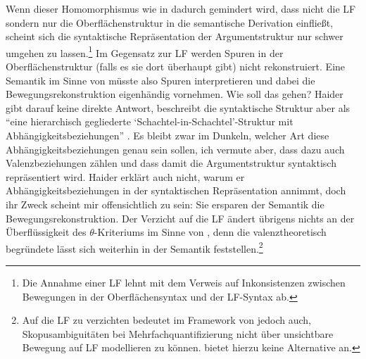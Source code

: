 {Wenn dieser Homomorphismus wie in \cite{Haider:04} dadurch gemindert wird, dass nicht die LF sondern nur die Oberflächenstruktur in die semantische Derivation einflie\ss t, scheint sich die syntaktische Repräsentation der Argumentstruktur nur schwer umgehen zu lassen.\footnote{Die Annahme einer LF lehnt \cite{Haider:04} mit dem Verweis auf Inkonsistenzen zwischen Bewegungen in der Oberflächensyntax und der LF-Syntax ab.} Im Gegensatz zur LF werden Spuren in der Oberflächenstruktur (falls es sie dort überhaupt gibt) nicht rekonstruiert. Eine Semantik im Sinne von \cite{Heim:Kratzer:98} müsste also Spuren interpretieren und dabei die Bewegungsrekonstruktion eigenhändig vornehmen. Wie soll das gehen? Haider gibt darauf keine direkte Antwort, beschreibt die syntaktische Struktur aber als "`eine hierarchisch gegliederte `Schachtel-in-Schachtel'-Struktur mit Abhängigkeitsbeziehungen"' \citep[73]{Haider:04}. Es bleibt zwar im Dunkeln, welcher Art diese Abhängigkeitsbeziehungen genau sein sollen, ich vermute aber, dass dazu auch Valenzbeziehungen zählen und dass damit die Argumentstruktur syntaktisch repräsentiert wird. Haider erklärt auch nicht, warum er Abhängigkeitsbeziehungen in der syntaktischen Repräsentation annimmt, doch ihr Zweck scheint 	mir offensichtlich zu sein: Sie ersparen der Semantik die Bewegungsrekonstruktion. Der Verzicht auf die LF ändert übrigens nichts an der Überflüssigkeit des $\theta$-Kriteriums im Sinne von \cite{Heim:Kratzer:98}, denn die valenztheoretisch begründete  lässt sich weiterhin in der Semantik feststellen.\footnote{Auf die LF zu verzichten bedeutet im Framework von \cite{Heim:Kratzer:98} jedoch auch, Skopusambiguitäten bei Mehrfachquantifizierung nicht über unsichtbare Bewegung auf LF modellieren zu können. \cite{Haider:04} bietet hierzu keine Alternative an.}  

}
